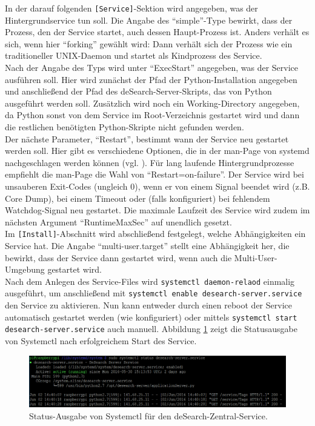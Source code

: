 In der darauf folgenden \texttt{[Service]}-Sektion wird angegeben, was der Hintergrundservice tun soll. Die Angabe des \enquote{simple}-Type bewirkt, dass der Prozess, den der Service startet, auch dessen Haupt-Prozess ist. Anders verhält es sich, wenn hier \enquote{forking} gewählt wird: Dann verhält sich der Prozess wie ein traditioneller UNIX-Daemon und startet als Kindprozess des Service. \\
Nach der Angabe des Typs wird unter \enquote{ExecStart} angegeben, was der Service ausführen soll. Hier wird zunächst der Pfad der Python-Installation angegeben und anschließend der Pfad des deSearch-Server-Skripts, das von Python ausgeführt werden soll. Zusätzlich wird noch ein Working-Directory angegeben, da Python sonst von dem Service im Root-Verzeichnis gestartet wird und dann die restlichen benötigten Python-Skripte nicht gefunden werden. \\
Der nächste Parameter, \enquote{Restart}, bestimmt wann der Service neu gestartet werden soll. Hier gibt es verschiedene Optionen, die in der man-Page von systemd nachgeschlagen werden können (vgl. \cite{systemd-service}). Für lang laufende Hintergrundprozesse empfiehlt die man-Page die Wahl von \enquote{Restart=on-failure}. Der Service wird bei unsauberen Exit-Codes (ungleich 0), wenn er von einem Signal beendet wird (z.B. Core Dump), bei einem Timeout oder (falls konfiguriert) bei fehlendem Watchdog-Signal neu gestartet. Die maximale Laufzeit des Service wird zudem im nächsten Argument \enquote{RuntimeMaxSec} auf unendlich gesetzt.\\
Im \texttt{[Install]}-Abschnitt wird abschließend festgelegt, welche Abhängigkeiten ein Service hat. Die Angabe \enquote{multi-user.target} stellt eine Abhängigkeit her, die bewirkt, dass der Service dann gestartet wird, wenn auch die Multi-User-Umgebung gestartet wird. \\
Nach dem Anlegen des Service-Files wird \texttt{systemctl daemon-relaod} einmalig ausgeführt, um anschließend mit \texttt{systemctl enable desearch-server.service} den Service zu aktivieren. Nun kann entweder durch einen reboot der Service automatisch gestartet werden (wie konfiguriert) oder mittels \texttt{systemctl start desearch-server.service} auch manuell. Abbildung \ref{fig:systemctl-status} zeigt die Statusausgabe von Systemctl nach erfolgreichem Start des Service.
\begin{figure}[bth]
	\centering
	\includegraphics[width=1.0\linewidth]{images/service-status}
	\caption[Status-Ausgabe von Systemctl]{Status-Ausgabe von Systemctl für den deSearch-Zentral-Service.}
	\label{fig:systemctl-status}
\end{figure}

